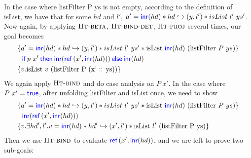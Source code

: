 \documentclass{article}
\begin{document}
In the case where $\text{listFilter P ys}$ is not empty,
according to the definition of isList, we have that for some
$hd$ and $l'$, $a' = \textsf{\color{blue} inr}(hd) \ast hd \hookrightarrow (y, l') \ast isList \ l' \ ys' $.
Now again, by applying
$\textsc{Ht-beta}$, $\textsc{Ht-bind-det}$,
$\textsc{Ht-proj}$ several times, our goal becomes
\begin{align*}
     & \{a' = \Inr(hd) \star hd \gmapsto (y, l') \star isList \ l' \ ys' \star \text{isList} \ \Inr(hd) \ (\text{listFilter} \ P \ ys)\} \\
     & \ \ \If{p \ x'}then{\Inr(\Ref(x', \Inr(hd)))}\Else{\Inr(hd)}                                                                      \\
     & \{v. \text{isList} \ v \ (\text{listFilter P (x' :: ys)})\}
\end{align*}
We again apply $\textsc{Ht-bind}$ and do case analysis on $P \ x'$. In the case where
$P \ x' = \textsf{\color{blue} true}$, after unfolding listFilter and isList once, we need to show
\begin{align*}
     & \{a' = \Inr(hd) \star hd \gmapsto (y, l') \star isList \ l' \ ys' \star \text{isList} \ \Inr(hd) \ (\text{listFilter} \ P \ ys)\} \\
     & \ \ {\Inr(\Ref(x', \Inr(hd)))}                                                                                                    \\
     & \{v. \exists hd', l'. v = \Inr(hd) \star hd' \gmapsto (x', l') \star \text{isList} \ l' \ (\text{listFilter P ys})\}
\end{align*}
Then we use $\textsc{Ht-bind}$ to evaluate $\Ref(x', \Inr(hd))$, and we are left to prove two sub-goals:
\end{document}
